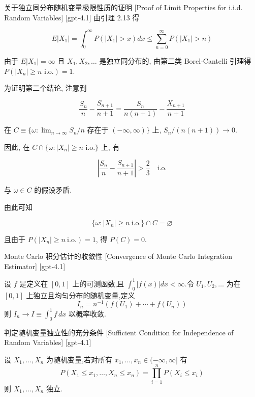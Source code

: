 \documentclass[UTF8]{ctexart}
\begin{document}
    
    
    \begin{prf}
        {关于独立同分布随机变量极限性质的证明}
        [Proof of Limit Properties for i.i.d. Random Variables]
        [gpt-4.1]
        由引理 2.13 得

\[
E | X_1 | = \int_0^{\infty} P ( | X_1 | > x ) dx \leq \sum_{n=0}^{\infty} P ( | X_1 | > n )
\]

由于 $E | X_1 | = \infty$ 且 $X_1, X_2, \dots$ 是独立同分布的, 由第二类 Borel-Cantelli 引理得 $P ( | X_n | \geq n \text{ i.o.} ) = 1$.

为证明第二个结论, 注意到

\[
\frac{ S_n }{ n } - \frac{ S_{n+1} }{ n+1 } = \frac{ S_n }{ n ( n+1 ) } - \frac{ X_{n+1} }{ n+1 }
\]

在 $C \equiv \{ \omega : \lim_{n \to \infty} S_n / n \text{ 存在于 } ( -\infty, \infty ) \}$ 上, $S_n / ( n ( n+1 ) ) \to 0$.

因此, 在 $C \cap \{ \omega : | X_n | \geq n \text{ i.o.} \}$ 上, 有

\[
\left| \frac{ S_n }{ n } - \frac{ S_{n+1} }{ n+1 } \right| > \frac{2}{3} \quad \text{i.o.}
\]

与 $\omega \in C$ 的假设矛盾.

由此可知

\[
\{ \omega : | X_n | \geq n \ \text{i.o.} \} \cap C = \varnothing
\]

且由于 $P ( | X_n | \geq n \ \text{i.o.} ) = 1$, 得 $P ( C ) = 0$.

    \end{prf}
    
    
    
    \begin{thm}
        {Monte Carlo 积分估计的收敛性}
        [Convergence of Monte Carlo Integration Estimator]
        [gpt-4.1]
        
设 $f$ 是定义在 $[0,1]$ 上的可测函数,且 $\int_{0}^{1} |f(x)| dx < \infty$.令 $U_1, U_2, \dots$ 为在 $[0,1]$ 上独立且均匀分布的随机变量,定义
\[
I_n = n^{-1} (f(U_1) + \cdots + f(U_n))
\]
则 $I_n \to I \equiv \int_{0}^{1} f\, dx$ 以概率收敛.

    \end{thm}
    
    
    
    \begin{thm}
        {判定随机变量独立性的充分条件}
        [Sufficient Condition for Independence of Random Variables]
        [gpt-4.1]
        
设 $X_1, \ldots, X_n$ 为随机变量,若对所有 $x_1, \ldots, x_n \in (-\infty, \infty]$ 有
\[
P(X_1 \leq x_1, \ldots, X_n \leq x_n) = \prod_{i=1}^{n} P(X_i \leq x_i)
\]
则 $X_1, \ldots, X_n$ 独立.

    \end{thm}
    
\end{document}
